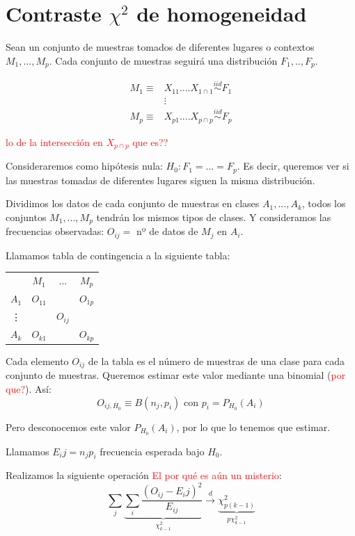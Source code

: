 \documentclass[nochap]{apuntes}
\begin{document}
\section{Contraste $\chi^2$ de homogeneidad}
Sean un conjunto de muestras tomados de diferentes lugares o contextos $M_1,...,M_p$. Cada conjunto de muestras seguirá una distribución $F_1,..,F_p$.

\begin{align*}
M_1 \equiv & X_{11} .... X_{1\cap 1} \stackrel{iid}{\sim} F_1 \\
& \vdots \\
M_p \equiv & X_{p1} .... X_{p\cap p} \stackrel{iid}{\sim} F_p
\end{align*}

\textcolor{red}{lo de la intersección en $X_{p\cap p}$ que es??}

Consideraremos como hipótesis nula: $H_0: F_1=...=F_p$. Es decir, queremos ver si las muestras tomadas de diferentes lugares siguen la misma distribución.

Dividimos los datos de cada conjunto de muestras en clases $A_1,...,A_k$, todos los conjuntos $M_1,...,M_p$ tendrán los mismos tipos de clases. Y consideramos las frecuencias observadas: $O_{ij}=$ nº de datos de $M_j$ en $A_i$.

Llamamos tabla de contingencia a la siguiente tabla:

\begin{tabular}{cccc}
& $M_1$ & ... & $M_p$ \\
$A_1$ & $O_{11}$ &  & $O_{1p}$ \\
\vdots &  & $O_{ij}$ &  \\
$A_k$ & $O_{k1}$ &  & $O_{kp}$ \\
\end{tabular}

Cada elemento $O_{ij}$ de la tabla es el número de muestras de una clase para cada conjunto de muestras. Queremos estimar este valor mediante una binomial (\textcolor{red}{por que?}). Así:
$$ O_{ij,H_0} \equiv B(n_j, p_i)  \text{ con } p_i=P_{H_0}(A_i)$$

Pero desconocemos este valor $P_{H_0}(A_i)$, por lo que lo tenemos que estimar.

Llamamos $E_ij =n_j p_i$ frecuencia esperada bajo $H_0$.

Realizamos la siguiente operación \textcolor{red}{El por qué es aún un misterio}:
$$ \sum_j \underbrace{\sum_i \frac{(O_{ij}-E_ij)^2}{E_{ij}}}_{\chi^2_{k-1}} \stackrel{d}{\rightarrow} \underbrace{\chi^2_{p(k-1)}}_{p\chi^2_{k-1}} $$
\end{document}
